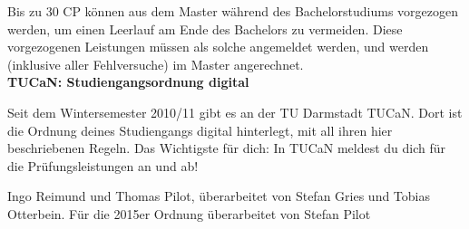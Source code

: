 {    Bis zu 30 CP können aus dem Master während des Bachelorstudiums vorgezogen werden, um einen Leerlauf am Ende des Bachelors zu vermeiden. Diese vorgezogenen Leistungen müssen als solche angemeldet werden, und werden (inklusive aller Fehlversuche) im Master angerechnet.\\

    \noindent\textbf{TUCaN: Studiengangsordnung digital}

    Seit dem Wintersemester 2010/11 gibt es an der TU Darmstadt TUCaN. Dort ist die Ordnung deines Studiengangs digital hinterlegt, mit all ihren hier beschriebenen Regeln. Das Wichtigste für dich: In TUCaN meldest du dich für die Prüfungsleistungen an und ab!
}
{Ingo Reimund und Thomas Pilot, überarbeitet von Stefan Gries und Tobias Otterbein. Für die 2015er Ordnung überarbeitet von Stefan Pilot}
